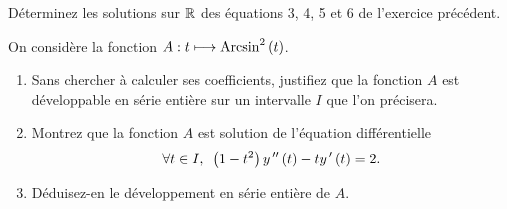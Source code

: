 \begin{exoss}
Déterminez les solutions sur \(\mathbb{R}\) des équations 3, 4, 5 et 6 de l'exercice précédent.
\end{exoss}

\begin{exoss}
On considère la fonction \(A:t\longmapsto\operatorname{Arcsin}^2\left(t\right)\).

\begin{enumerate}
    \item Sans chercher à calculer ses coefficients, justifiez que la fonction \(A\) est développable en série entière sur un intervalle \(I\) que l'on précisera. \\
    \item Montrez que la fonction \(A\) est solution de l'équation différentielle \[\quantifs{\forall t\in I}\paren{1-t^2}y\seconde\paren{t}-ty\prim\paren{t}=2.\]
    \item Déduisez-en le développement en série entière de \(A\).
\end{enumerate}
\end{exoss}

